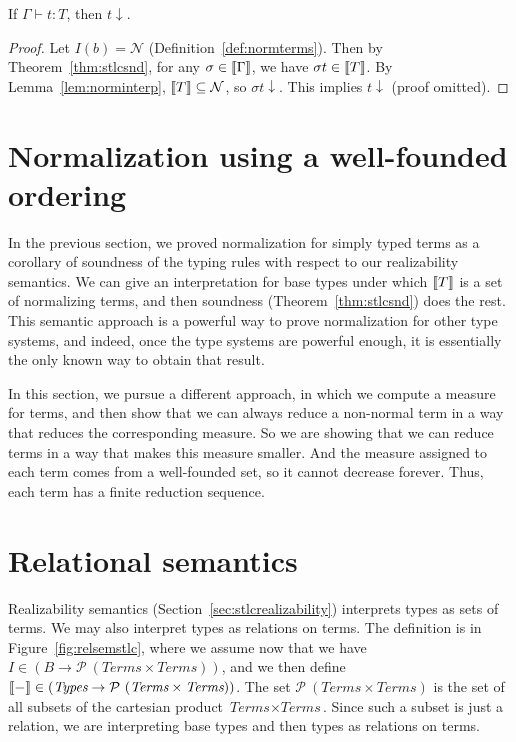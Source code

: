 \begin{corollary}
If $\Gamma\vdash t : T$, then $t \downarrow$.
\end{corollary}
\begin{proof} Let $I(b) = \mathcal{N}$ (Definition~\ref{def:normterms}).  Then by Theorem~\ref{thm:stlcsnd},
  for any $\sigma\in\llbracket \Gamma \rrbracket$, we have $\sigma t \in \llbracket T \rrbracket$.  By Lemma~\ref{lem:norminterp},
  $\llbracket T \rrbracket\subseteq \mathcal{N}$, so $\sigma t\downarrow$.  This implies $t\downarrow$ (proof omitted). %
  \end{proof}
 
\section{Normalization using a well-founded ordering}

In the previous section, we proved normalization for simply typed
terms as a corollary of soundness of the typing rules with respect to
our realizability semantics.  We can give an interpretation
for base types under which $\llbracket T \rrbracket$ is a set of normalizing
terms, and then soundness (Theorem~\ref{thm:stlcsnd}) does the rest.
This semantic approach is a powerful way to prove normalization for
other type systems, and indeed, once the type systems are powerful
enough, it is essentially the only known way to obtain that result.

In this section, we pursue a different approach, in which we compute a
measure for terms, and then show that we can always reduce a
non-normal term in a way that reduces the corresponding measure.
So we are showing that we can reduce terms in a way that makes this
measure smaller.  And the measure assigned to each term comes from
a well-founded set, so it cannot decrease forever.  Thus, each
term has a finite reduction sequence.


\section{Relational semantics}

Realizability semantics (Section~\ref{sec:stlcrealizability})
interprets types as sets of terms.  We may also interpret types as
relations on terms.  The definition is in Figure~\ref{fig:relsemstlc},
where we assume now that we have $I \in (B \to
\mathcal{P}\ (\textit{Terms} \times \textit{Terms}))$, and we then
define $\llbracket - \rrbracket\in (\textit{Types} \to \mathcal{P}\ (\textit{Terms}
\times \textit{Terms}))$.  The set $\mathcal{P}\ (\textit{Terms} \times
\textit{Terms})$ is the set of all subsets of the cartesian product
$\textit{Terms} \times \textit{Terms}$.  Since such a subset is just a
relation, we are interpreting base types and then types as relations on
terms.

